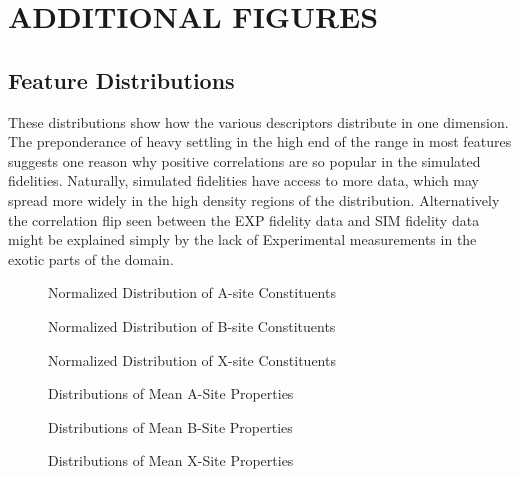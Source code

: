 \chapter{ADDITIONAL FIGURES}
\label{sec:org1d13a8e}
\section*{Feature Distributions}
\label{sec:orga7ccdab}
These distributions show how the various descriptors distribute in one dimension.
The preponderance of heavy settling in the high end of the range in most features suggests one reason why positive correlations are so popular in the simulated fidelities.
Naturally, simulated fidelities have access to more data, which may spread more widely in the high density regions of the distribution.
Alternatively the correlation flip seen between the EXP fidelity data and SIM fidelity data might be explained simply by the lack of Experimental measurements in the exotic parts of the domain.

\begin{figure}[h!]
\centering

\caption{Normalized Distribution of A-site Constituents}
\end{figure}

 
\begin{figure}[h!]
\centering

\caption{Normalized Distribution of B-site Constituents}
\end{figure}

 
\begin{figure}[h!]
\centering

\caption{Normalized Distribution of X-site Constituents}
\end{figure}

 
\begin{figure}[h!]
\centering

\caption{Distributions of Mean A-Site Properties}
\end{figure}

 
\begin{figure}[h!]
\centering

\caption{Distributions of Mean B-Site Properties}
\end{figure}

 
\begin{figure}[h!]
\centering

\caption{Distributions of Mean X-Site Properties}
\end{figure}

